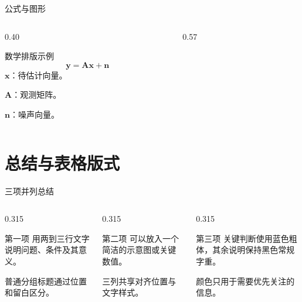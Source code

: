 \documentclass[aspectratio=169,11pt]{beamer}
\begin{document}
\begin{frame}{公式与图形}
  \begin{columns}[T,onlytextwidth]
    \begin{column}{0.40\textwidth}
      \begin{PCLPanel}{数学排版示例}
        \[\mathbf{y}=\mathbf{A}\mathbf{x}+\mathbf{n}\]
        \small
        \(\mathbf{x}\)：待估计向量。\par\medskip
        \(\mathbf{A}\)：观测矩阵。\par\medskip
        \(\mathbf{n}\)：噪声向量。
      \end{PCLPanel}
    \end{column}
    \begin{column}{0.57\textwidth}
    \end{column}
  \end{columns}
\end{frame}

\section{总结与表格版式}
\begin{frame}{三项并列总结}
  \begin{columns}[T,onlytextwidth]
    \begin{column}{0.315\textwidth}
      \begin{PCLPanel}[height=43mm]{第一项}
        用两到三行文字说明问题、条件及其意义。
        \par\medskip
        普通分组标题通过位置和留白区分。
      \end{PCLPanel}
    \end{column}
    \begin{column}{0.315\textwidth}
      \begin{PCLPanel}[height=43mm]{第二项}
        可以放入一个简洁的示意图或关键数值。
        \par\medskip
        三列共享对齐位置与文字样式。
      \end{PCLPanel}
    \end{column}
    \begin{column}{0.315\textwidth}
      \begin{PCLPanel}[height=43mm]{第三项}
        \alert{关键判断}使用蓝色粗体，其余说明保持黑色常规字重。
        \par\medskip
        颜色只用于需要优先关注的信息。
      \end{PCLPanel}
    \end{column}
  \end{columns}
\end{frame}
\end{document}
